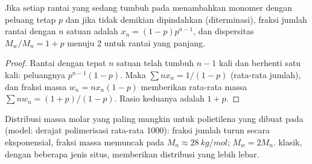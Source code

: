 \begin{proposition}\label{prop:b3:homogeneous-catalysis:schulz-flory}
Jika setiap rantai yang sedang tumbuh pada  menambahkan monomer dengan
peluang tetap $p$ dan jika tidak demikian dipindahkan (diterminasi), fraksi jumlah
rantai dengan $n$ satuan adalah $x_n = (1 - p)p^{n-1}$, dan dispersitas $M_w/M_n = 1 + p$ menuju 2 untuk rantai yang panjang.
\end{proposition}

\begin{proof}
Rantai dengan tepat $n$ satuan telah tumbuh $n - 1$ kali dan berhenti satu kali:
peluangnya $p^{n-1}(1 - p)$. Maka $\sum nx_n = 1/(1 - p)$ (rata-rata jumlah), dan fraksi
massa $w_n = nx_n(1 - p)$ memberikan rata-rata massa $\sum nw_n = (1 + p)/(1 - p)$. Rasio
keduanya adalah $1 + p$.
\end{proof}

\begin{omfigure}

{\small Distribusi massa molar yang paling mungkin untuk polietilena yang dibuat pada
 (model: derajat polimerisasi rata-rata 1000): fraksi
jumlah turun secara eksponensial, fraksi massa memuncak pada $M_n \approx \qty{28}{kg/mol}$; $M_w = 2M_n$.  klasik, dengan beberapa jenis situs, memberikan distribusi yang
lebih lebar.}
\end{omfigure}

